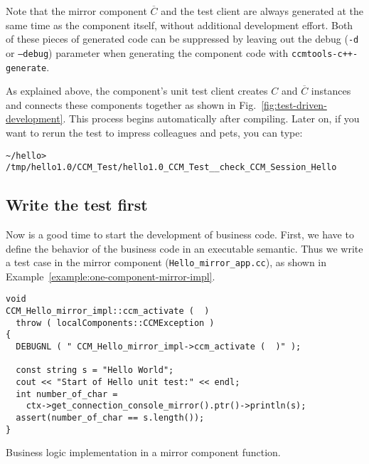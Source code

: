 Note that the mirror component $\overline{C}$ and the test client are always
generated at the same time as the component itself, without additional
development effort. Both of these pieces of generated code can be suppressed by
leaving out the debug ({\tt -d} or {\tt --debug}) parameter when generating the
component code with {\tt ccmtools-c++-generate}.

As explained above, the component's unit test client creates $C$ and
$\overline{C}$ instances and connects these components together as shown in
Fig.~\ref{fig:test-driven-development}. This process begins automatically after
compiling. Later on, if you want to rerun the test to impress colleagues and
pets, you can type:
\begin{small}
\begin{verbatim}
~/hello> /tmp/hello1.0/CCM_Test/hello1.0_CCM_Test__check_CCM_Session_Hello
\end{verbatim}
\end{small}

\subsection{Write the test first}

Now is a good time to start the development of business code. First, we have to
define the behavior of the business code in an executable semantic. Thus we
write a test case in the mirror component ({\tt Hello\_mirror\_app.cc}), as
shown in Example~\ref{example:one-component-mirror-impl}.

\begin{Example}
\begin{minifbox}
\begin{small}
\begin{verbatim}
void
CCM_Hello_mirror_impl::ccm_activate (  )
  throw ( localComponents::CCMException )
{
  DEBUGNL ( " CCM_Hello_mirror_impl->ccm_activate (  )" );

  const string s = "Hello World";
  cout << "Start of Hello unit test:" << endl;
  int number_of_char =
    ctx->get_connection_console_mirror().ptr()->println(s);
  assert(number_of_char == s.length());
}
\end{verbatim}
\end{small}
\end{minifbox}
\caption{Business logic implementation in a mirror component function.}
\label{example:one-component-mirror-impl}
\end{Example}

